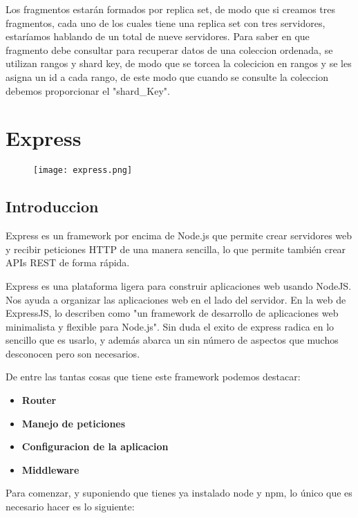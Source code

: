 Los fragmentos estarán formados por replica set, de modo que
si creamos tres fragmentos, cada uno de los cuales tiene una
replica set con tres servidores, estaríamos hablando de un
total de nueve servidores. Para saber en que fragmento debe
consultar para recuperar datos de una coleccion ordenada, se
utilizan rangos y shard key, de modo que se torcea la colecicion en rangos y se les asigna un id a cada rango, de este modo que cuando se consulte la coleccion debemos proporcionar el "shard_Key".




\section{Express}

\begin{figure}[H]
    \centering
    \texttt{[image: express.png]}
\end{figure}

\subsection{Introduccion}
Express es un framework por encima de Node.js que permite crear servidores web y recibir peticiones HTTP de una manera sencilla, lo que permite también crear APIs REST de forma rápida.

Express es una plataforma ligera para construir aplicaciones web usando NodeJS. Nos ayuda a organizar las aplicaciones web en el lado del servidor. En la web de ExpressJS, lo describen como "un framework de desarrollo de aplicaciones web minimalista y flexible para Node.js". Sin duda el exito de express radica en lo sencillo que es usarlo, y además abarca un sin número de aspectos que muchos desconocen pero son necesarios.

De entre las tantas cosas que tiene este framework podemos destacar:

\begin{itemize}

\item \textbf{Router}
\item \textbf{Manejo de peticiones}
\item \textbf{Configuracion de la aplicacion}
\item \textbf{Middleware}
\end{itemize}

Para comenzar, y suponiendo que tienes ya instalado node y npm, lo único que es necesario hacer es lo siguiente:

